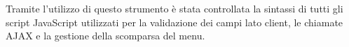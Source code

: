 Tramite l’utilizzo di questo strumento è stata controllata la sintassi di tutti gli script JavaScript utilizzati per la validazione dei campi lato client, le chiamate AJAX e la gestione della scomparsa del menu.